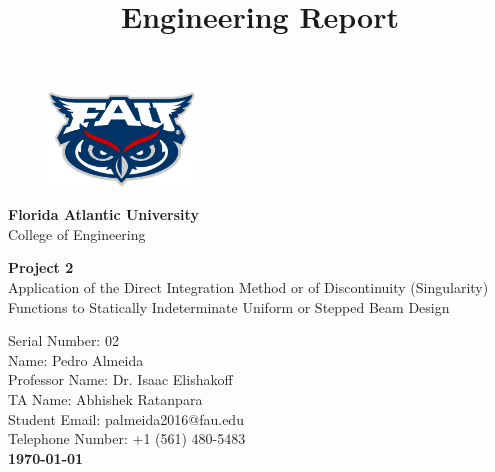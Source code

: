 \documentclass[a4paper]{article}
\begin{document}
\title{Engineering Report}


\begin{titlepage}
	\begin{center}
		\begin{figure}[htb!]
			\begin{flushleft}
				\includegraphics[width=3.9cm]{images/fau_logo.jpeg}
			\end{flushleft}
		\end{figure}
        \vspace{-2.5cm}
        \hspace{2.1cm}\Large{\textbf{Florida Atlantic University}}\\
        \hspace{2.1cm}\Large{College of Engineering}\\
        
        \vspace{200pt}
        
        \LARGE{\textbf{Project 2}}\\ 
        \Large{Application of the Direct Integration Method or of Discontinuity (Singularity) Functions to Statically Indeterminate Uniform or Stepped Beam Design}\\ 
        
        \vspace{100pt}
        
        \hfill Serial Number: 02 \\
        
        \vspace{30pt} 
        \hfill Name: Pedro Almeida\\
        \hfill Professor Name: Dr. Isaac Elishakoff\\
        \hfill TA Name: Abhishek Ratanpara\\
        \hfill Student Email: palmeida2016@fau.edu\\
        \hfill Telephone Number: +1 (561) 480-5483\\
        
        
        \vspace{\fill}
        \LARGE \bf{\today}
          
	\end{center}
\end{titlepage}
\end{document}
